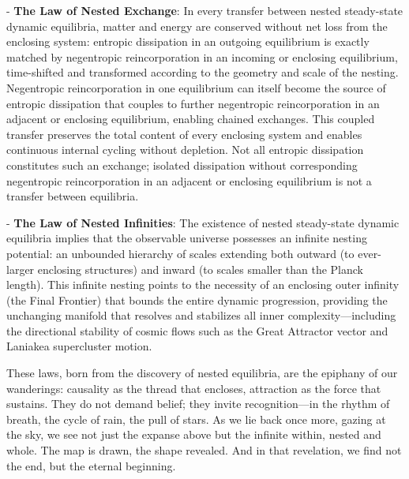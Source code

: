 - \textbf{The Law of Nested Exchange}: In every transfer between nested steady-state dynamic equilibria, matter and energy are conserved without net loss from the enclosing system: entropic dissipation in an outgoing equilibrium is exactly matched by negentropic reincorporation in an incoming or enclosing equilibrium, time-shifted and transformed according to the geometry and scale of the nesting. Negentropic reincorporation in one equilibrium can itself become the source of entropic dissipation that couples to further negentropic reincorporation in an adjacent or enclosing equilibrium, enabling chained exchanges. This coupled transfer preserves the total content of every enclosing system and enables continuous internal cycling without depletion. Not all entropic dissipation constitutes such an exchange; isolated dissipation without corresponding negentropic reincorporation in an adjacent or enclosing equilibrium is not a transfer between equilibria.

- \textbf{The Law of Nested Infinities}: The existence of nested steady-state dynamic equilibria implies that the observable universe possesses an infinite nesting potential: an unbounded hierarchy of scales extending both outward (to ever-larger enclosing structures) and inward (to scales smaller than the Planck length). This infinite nesting points to the necessity of an enclosing outer infinity (the Final Frontier) that bounds the entire dynamic progression, providing the unchanging manifold that resolves and stabilizes all inner complexity—including the directional stability of cosmic flows such as the Great Attractor vector and Laniakea supercluster motion.

These laws, born from the discovery of nested equilibria, are the epiphany of our wanderings: causality as the thread that encloses, attraction as the force that sustains. They do not demand belief; they invite recognition—in the rhythm of breath, the cycle of rain, the pull of stars. As we lie back once more, gazing at the sky, we see not just the expanse above but the infinite within, nested and whole. The map is drawn, the shape revealed. And in that revelation, we find not the end, but the eternal beginning.
